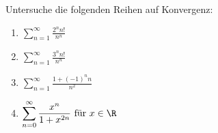 \begin{prob}
  Untersuche die folgenden Reihen auf Konvergenz:
  \begin{enumerate}[label=(\alph*)]
  \item $\displaystyle \sum_{n=1}^\infty \frac{2^n n!}{n^n}$
  \item $\displaystyle \sum_{n=1}^\infty \frac{3^n n!}{n^n}$
  \item $\displaystyle \sum_{n=1}^\infty \frac{1 + (-1)^n n}{n^2}$
  \item $\displaystyle \sum_{n=0}^\infty \frac{x^n}{1+x^{2n}} \text{ für } x \in \R$
  \end{enumerate}
\end{prob}
